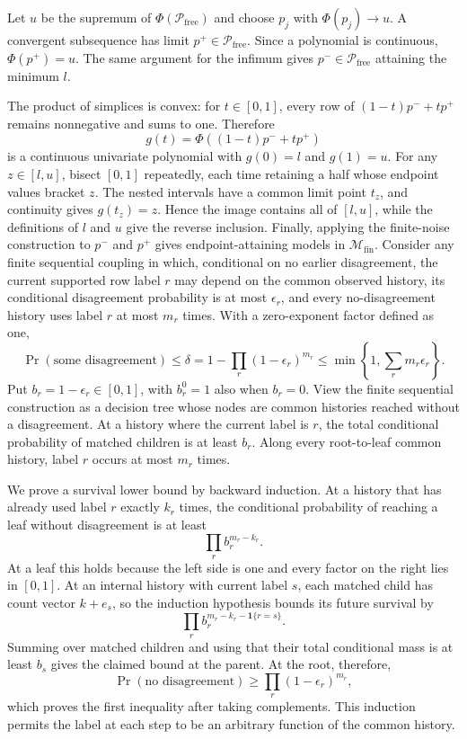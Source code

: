 Let \(u\) be the supremum of \(\Phi(\mathcal P_{\mathrm{free}})\) and choose \(p_j\) with \(\Phi(p_j)\to u\).  A convergent subsequence has limit \(p^+\in\mathcal P_{\mathrm{free}}\).  Since a polynomial is continuous, \(\Phi(p^+)=u\).  The same argument for the infimum gives \(p^-\in\mathcal P_{\mathrm{free}}\) attaining the minimum \(l\).

The product of simplices is convex: for \(t\in[0,1]\), every row of \((1-t)p^-+tp^+\) remains nonnegative and sums to one.  Therefore
\[
 g(t)=\Phi((1-t)p^-+tp^+)
\]
is a continuous univariate polynomial with \(g(0)=l\) and \(g(1)=u\).  For any \(z\in[l,u]\), bisect \([0,1]\) repeatedly, each time retaining a half whose endpoint values bracket \(z\).  The nested intervals have a common limit point \(t_z\), and continuity gives \(g(t_z)=z\).  Hence the image contains all of \([l,u]\), while the definitions of \(l\) and \(u\) give the reverse inclusion.  Finally, applying the finite-noise construction to \(p^-\) and \(p^+\) gives endpoint-attaining models in \(\mathcal M_{\mathrm{fin}}\).
Consider any finite sequential coupling in which, conditional on no earlier disagreement, the current supported row label \(r\) may depend on the common observed history, its conditional disagreement probability is at most \(\epsilon_r\), and every no-disagreement history uses label \(r\) at most \(m_r\) times.  With a zero-exponent factor defined as one,
\[
 \Pr(\text{some disagreement})\leq
 \delta=1-\prod_r(1-\epsilon_r)^{m_r}
 \leq\min\left\{1,\sum_r m_r\epsilon_r\right\}.
\]
Put \(b_r=1-\epsilon_r\in[0,1]\), with \(b_r^0=1\) also when \(b_r=0\).  View the finite sequential construction as a decision tree whose nodes are common histories reached without a disagreement.  At a history where the current label is \(r\), the total conditional probability of matched children is at least \(b_r\).  Along every root-to-leaf common history, label \(r\) occurs at most \(m_r\) times.

We prove a survival lower bound by backward induction.  At a history that has already used label \(r\) exactly \(k_r\) times, the conditional probability of reaching a leaf without disagreement is at least
\[
 \prod_r b_r^{m_r-k_r}.
\]
At a leaf this holds because the left side is one and every factor on the right lies in \([0,1]\).  At an internal history with current label \(s\), each matched child has count vector \(k+e_s\), so the induction hypothesis bounds its future survival by
\[
 \prod_r b_r^{m_r-k_r-\mathbf 1\{r=s\}}.
\]
Summing over matched children and using that their total conditional mass is at least \(b_s\) gives the claimed bound at the parent.  At the root, therefore,
\[
 \Pr(\text{no disagreement})\geq\prod_r(1-\epsilon_r)^{m_r},
\]
which proves the first inequality after taking complements.  This induction permits the label at each step to be an arbitrary function of the common history.

